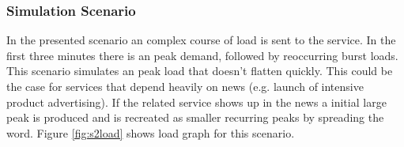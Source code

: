 %
%
%
%


\subsubsection{Simulation Scenario}\label{SimScen2}
In the presented scenario an complex course of load is sent to the service. In the first three minutes there is an peak demand, followed by reoccurring burst loads. This scenario simulates an peak load that doesn't  flatten quickly. This could be the case for services that depend heavily on news (e.g. launch of intensive product advertising). If the related service shows up in the news a initial large peak is produced and is recreated as smaller recurring peaks by spreading the word. Figure \ref{fig:s2load} shows load graph for this scenario.%

